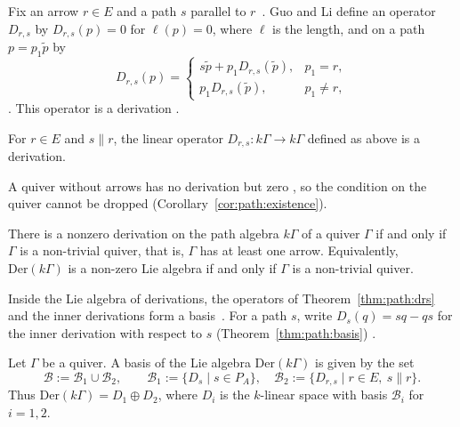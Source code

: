 Fix an arrow $r\in E$ and a path $s$ parallel to $r$~\cite[p.~554]{GuoLi2014}. Guo and Li define an operator
$D_{r,s}$ by $D_{r,s}(p)=0$ for $\ell(p)=0$, where $\ell$ is the length, and on a path
$p=p_{1}\tilde p$ by
\begin{equation*}
D_{r,s}(p)=
\begin{cases}
s\tilde p+p_{1}D_{r,s}(\tilde p), & p_{1}=r,\\
p_{1}D_{r,s}(\tilde p), & p_{1}\neq r,
\end{cases}
\end{equation*}
\cite[pp.~553--554]{GuoLi2014}. This operator is a derivation
\cite[p.~554]{GuoLi2014}.

\begin{theorem}\label{thm:path:drs}
For $r\in E$ and $s\parallel r$, the linear operator
$D_{r,s}\colon k\Gamma\to k\Gamma$ defined as above is a derivation.
\end{theorem}

A quiver without arrows has no derivation but zero \cite[p.~554]{GuoLi2014},
so the condition on the quiver cannot be dropped
(Corollary~\ref{cor:path:existence}).

\begin{corollary}\label{cor:path:existence}
There is a nonzero derivation on the path algebra $k\Gamma$ of a quiver $\Gamma$ if
and only if $\Gamma$ is a non-trivial quiver, that is, $\Gamma$ has at least one
arrow. Equivalently, $\mathrm{Der}(k\Gamma)$ is a non-zero Lie algebra if and only
if $\Gamma$ is a non-trivial quiver.
\end{corollary}

Inside the Lie algebra of derivations, the operators of
Theorem~\ref{thm:path:drs} and the inner derivations form a basis~\cite[p.~555]{GuoLi2014}. For a path
$s$, write $D_{s}(q)=sq-qs$ for the inner derivation with respect to $s$
(Theorem~\ref{thm:path:basis}) \cite[p.~555]{GuoLi2014}.

\begin{theorem}\label{thm:path:basis}
Let $\Gamma$ be a quiver. A basis of the Lie algebra $\mathrm{Der}(k\Gamma)$ is
given by the set
\begin{equation*}
\mathcal B:=\mathcal B_{1}\cup\mathcal B_{2},\qquad
\mathcal B_{1}:=\{D_{s}\mid s\in P_{A}\},\quad
\mathcal B_{2}:=\{D_{r,s}\mid r\in E,\ s\parallel r\}.
\end{equation*}
Thus $\mathrm{Der}(k\Gamma)=D_{1}\oplus D_{2}$, where $D_{i}$ is the $k$-linear
space with basis $\mathcal B_{i}$ for $i=1,2$.
\end{theorem}

